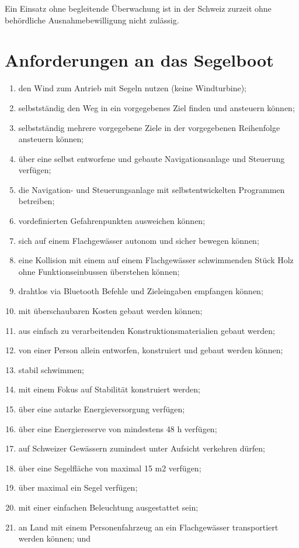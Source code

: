 Ein Einsatz ohne begleitende Überwachung ist in der Schweiz zurzeit ohne behördliche Ausnahmebewilligung nicht zulässig.


\section{Anforderungen an das Segelboot}
\begin{enumerate}
    \item den Wind zum Antrieb mit Segeln nutzen (keine Windturbine);
    \item selbstständig den Weg in ein vorgegebenes Ziel finden und ansteuern können;
    \item selbstständig mehrere vorgegebene Ziele in der vorgegebenen Reihenfolge ansteuern können;
    \item über eine selbst entworfene und gebaute Navigationsanlage und Steuerung verfügen;
    \item die Navigation- und Steuerungsanlage mit selbstentwickelten Programmen betreiben; 
    \item vordefinierten Gefahrenpunkten ausweichen können;
    \item sich auf einem Flachgewässer autonom und sicher bewegen können;
    \item eine Kollision mit einem auf einem Flachgewässer schwimmenden Stück Holz ohne Funktionseinbussen überstehen können;
    \item drahtlos via Bluetooth Befehle und Zieleingaben empfangen können;
    \item mit überschaubaren Kosten gebaut werden können;
    \item aus einfach zu verarbeitenden Konstruktionsmaterialien gebaut werden;
    \item von einer Person allein entworfen, konstruiert und gebaut werden können;
    \item stabil schwimmen;
    \item mit einem Fokus auf Stabilität konstruiert werden;
    \item über eine autarke Energieversorgung verfügen;
    \item über eine Energiereserve von mindestens 48 h verfügen;
    \item auf Schweizer Gewässern zumindest unter Aufsicht verkehren dürfen;
    \item über eine Segelfläche von maximal 15 m2 verfügen;
    \item über maximal ein Segel verfügen;
    \item mit einer einfachen Beleuchtung ausgestattet sein;
    \item an Land mit einem Personenfahrzeug an ein Flachgewässer transportiert werden können; und
    \end{enumerate}


